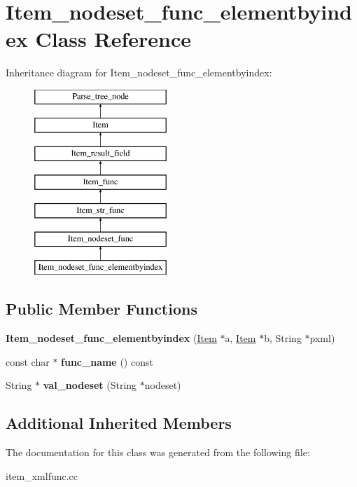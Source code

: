 \hypertarget{classItem__nodeset__func__elementbyindex}{}\section{Item\+\_\+nodeset\+\_\+func\+\_\+elementbyindex Class Reference}
\label{classItem__nodeset__func__elementbyindex}
Inheritance diagram for Item\+\_\+nodeset\+\_\+func\+\_\+elementbyindex\+:\begin{figure}[H]
\begin{center}
\leavevmode
\includegraphics[height=7.000000cm]{classItem__nodeset__func__elementbyindex}
\end{center}
\end{figure}
\subsection*{Public Member Functions}
\begin{DoxyCompactItemize}
\item 
\mbox{\label{classItem__nodeset__func__elementbyindex_a31368277186b836a8317299081767f09}} 
{\bfseries Item\+\_\+nodeset\+\_\+func\+\_\+elementbyindex} (\mbox{\hyperlink{classItem}{Item}} $\ast$a, \mbox{\hyperlink{classItem}{Item}} $\ast$b, String $\ast$pxml)
\item 
\mbox{\label{classItem__nodeset__func__elementbyindex_a112a6699213ce344dc48f844deab134e}} 
const char $\ast$ {\bfseries func\+\_\+name} () const
\item 
\mbox{\label{classItem__nodeset__func__elementbyindex_ae2cda1844f12cc31f719b5b80abca4ac}} 
String $\ast$ {\bfseries val\+\_\+nodeset} (String $\ast$nodeset)
\end{DoxyCompactItemize}
\subsection*{Additional Inherited Members}


The documentation for this class was generated from the following file\+:\begin{DoxyCompactItemize}
\item 
item\+\_\+xmlfunc.\+cc\end{DoxyCompactItemize}
